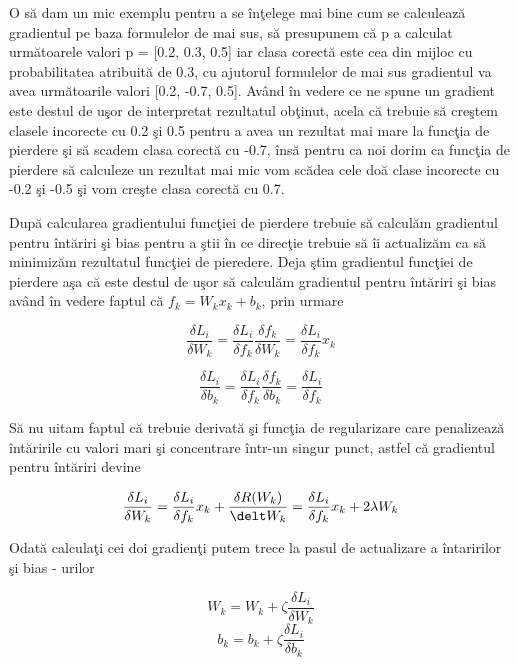 O s\u{a} dam un mic exemplu pentru a se \^{i}n\c{t}elege mai bine cum se calculeaz\u{a} gradientul pe baza formulelor de mai sus, s\u{a} presupunem c\u{a} p a calculat urm\u{a}toarele valori p = [0.2, 0.3, 0.5] iar clasa corect\u{a} este cea din mijloc cu probabilitatea atribuit\u{a} de 0.3, cu ajutorul formulelor de mai sus gradientul va avea urm\u{a}toarile valori [0.2, -0.7, 0.5]. Av\^{a}nd \^{i}n vedere ce ne spune un gradient este destul de u\c{s}or de interpretat rezultatul ob\c{t}inut, acela c\u{a} trebuie s\u{a} cre\c{s}tem clasele incorecte cu 0.2 \c{s}i 0.5 pentru a avea un rezultat mai mare la func\c{t}ia de pierdere \c{s}i s\u{a} scadem clasa corect\u{a} cu -0.7, \^{i}ns\u{a} pentru ca noi dorim ca func\c{t}ia de pierdere s\u{a} calculeze un rezultat mai mic vom sc\u{a}dea cele do\u{a} clase incorecte cu -0.2 \c{s}i -0.5 \c{s}i vom cre\c{s}te clasa corect\u{a} cu 0.7.

\par

Dup\u{a} calcularea gradientului func\c{t}iei de pierdere trebuie s\u{a} calcul\u{a}m gradientul pentru \^{i}nt\u{a}riri \c{s}i bias pentru a \c{s}tii \^{i}n ce direc\c{t}ie trebuie s\u{a} \^{i}i actualiz\u{a}m ca s\u{a} minimiz\u{a}m rezultatul func\c{t}iei de pieredere. Deja \c{s}tim gradientul func\c{t}iei de pierdere a\c{s}a c\u{a} este destul de u\c{s}or s\u{a} calcul\u{a}m gradientul pentru \^{i}nt\u{a}riri \c{s}i bias av\^{a}nd \^{i}n vedere faptul c\u{a} $f_k = W_k x_k + b_k$, prin urmare

$$\frac{\delta L_i}{\delta W_k} = \frac{\delta L_i}{\delta f_k} \frac{\delta f_k}{\delta W_k} = \frac{\delta L_i}{\delta f_k} x_k$$

$$\frac{\delta L_i}{\delta b_k} = \frac{\delta L_i}{\delta f_k} \frac{\delta f_k}{\delta b_k} = \frac{\delta L_i}{\delta f_k}$$

S\u{a} nu uitam faptul c\u{a} trebuie derivat\u{a} \c{s}i func\c{t}ia de regularizare care penalizeaz\u{a} \^{i}nt\u{a}ririle cu valori mari \c{s}i concentrare \^{i}ntr-un singur punct, astfel c\u{a} gradientul pentru \^{i}nt\u{a}riri devine 

$$\frac{\delta L_i}{\delta W_k} = \frac{\delta L_i}{\delta f_k} x_k + \frac{\delta R(W_k)}{\delt W_k} = \frac{\delta L_i}{\delta f_k} x_k + 2 \lambda W_k$$

Odat\u{a} calcula\c{t}i cei doi gradien\c{t}i putem trece la pasul de actualizare a \^{i}ntaririlor \c{s}i bias - urilor 

$$ W_k = W_k + \zeta \frac{\delta L_i}{\delta W_k} $$
$$b_k = b_k + \zeta \frac{\delta L_i}{\delta b_k} $$

